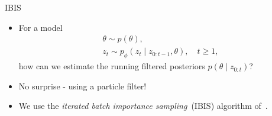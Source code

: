 \documentclass[10pt, aspectratio=1610]{beamer}
\begin{document}
    \begin{frame}{IBIS}
      \begin{itemize}[<+->]
        \item For a model
          \begin{gather}
            \theta \sim p(\theta), \\
            z_t \sim p_\phi(z_t \mid z_{0:t-1}, \theta), \quad t \geq 1,
          \end{gather}
          how can we estimate the running filtered posteriors $p(\theta \mid z_{0:t})$?
        \item No surprise - using a particle filter!
        \item We use the \emph{iterated batch importance sampling}~(IBIS) algorithm of~\citet{chopin2002sequential}.
      \end{itemize}
    \end{frame}
\end{document}
